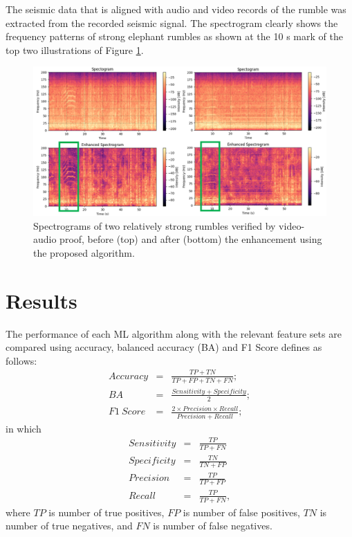 \documentclass[applsci,article,accept,moreauthors,pdftex]{Definitions/mdpi}
\begin{document}
The seismic data that is aligned with audio and video records of the rumble was extracted from the recorded seismic signal. The spectrogram clearly shows the frequency patterns of strong elephant rumbles as shown at the 10 s mark of the top two illustrations of Figure \ref{fig_Spectograms}.
\begin{figure}[h]
	\centering
	\includegraphics[width=5in]{figures/tworumbles.png}
	\caption{Spectrograms of two relatively strong rumbles verified by video-audio proof, before (top) and after (bottom) the enhancement using the proposed algorithm.}
	\label{fig_Spectograms}
\end{figure}
\section{Results}
The performance of each ML algorithm along with the relevant feature sets are compared using accuracy, balanced accuracy (BA) and F1 Score defines as follows:
\begin{eqnarray}
	Accuracy & =&  \frac{TP+TN}{TP+FP+TN+FN};\nonumber\\
	BA &=& \frac{Sensitivity+Specificity}{2};\nonumber\\
	F1~Score &=& \frac{2\times Precision\times Recall}{Precision + Recall};\nonumber
\end{eqnarray} in which
\begin{eqnarray}
	Sensitivity &=& \frac{TP}{TP+FN}\nonumber\\
	Specificity &=& \frac{TN}{TN+FP}\nonumber\\
	Precision &=&\frac{TP}{TP+FP}\nonumber\\
	Recall &=& \frac{TP}{TP+FN},\nonumber
\end{eqnarray}
where $TP$ is number of true positives, $FP$ is number of false positives, $TN$ is number of true negatives, and $FN$ is number of false negatives.
\end{document}
